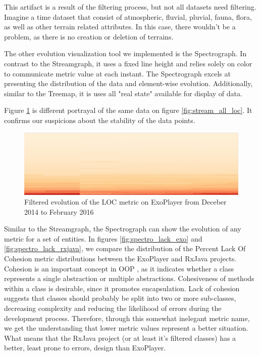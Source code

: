 This artifact is a result of the filtering process, but not all datasets need filtering. Imagine a time dataset that consist of atmospheric, fluvial, pluvial, fauna, flora, as well as other terrain related attributes. In this case, there wouldn't be a problem, as there is no creation or deletion of terrains.

The other evolution visualization tool we implemented is the Spectrograph. In contrast to the Streamgraph, it uses a fixed line height and relies solely on color to communicate metric value at each instant. The Spectrograph excels at presenting the distribution of the data and element-wise evolution. Additionally, similar to the Treemap, it is uses all "real state" available for display of data.

Figure \ref{fig:spectro_exo} is different portrayal of the same data on figure \ref{fig:stream_all_loc}. It confirms our suspicions about the stability of the data points.

\begin{figure}[H]
  \centering
  \includegraphics[width=1.0\textwidth]{figures/spectro_exo.png}
  \caption{Filtered evolution of the LOC metric on ExoPlayer from Deceber 2014 to February 2016}
  \label{fig:spectro_exo}
\end{figure}

Similar to the Streamgraph, the Spectrograph can show the evolution of any metric for a set of entities. In figures \ref{fig:spectro_lack_exo} and \ref{fig:spectro_lack_rxjava}, we compare the distribution of the Percent Lack Of Cohesion metric distributions between the ExoPlayer and RxJava projects. Cohesion is an important concept in OOP \cite{chidamber1994}, as it indicates whether a class represents a single abstraction or multiple abstractions. Cohesiveness of methods within a class is desirable, since it promotes encapsulation. Lack of cohesion suggests that classes should probably be split into two or more sub-classes, decreasing complexity and reducing the likelihood of errors during the development process. Therefore, through this somewhat inelegant metric name, we get the understanding that lower metric values represent a better situation. What means that the RxJava project (or at least it's filtered classes) has a better, least prone to errors, design than ExoPlayer.

